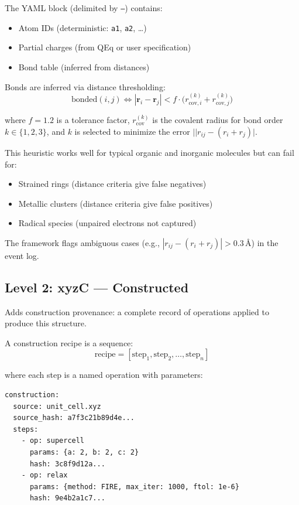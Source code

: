 \documentclass[11pt]{article}
\begin{document}
The YAML block (delimited by \texttt{---}) contains:
\begin{itemize}
\item Atom IDs (deterministic: \texttt{a1}, \texttt{a2}, \ldots)
\item Partial charges (from QEq or user specification)
\item Bond table (inferred from distances)
\end{itemize}

Bonds are inferred via distance thresholding:
\begin{equation}
\text{bonded}(i,j) \iff |\mathbf{r}_i - \mathbf{r}_j| < f \cdot \bigl(r_{\text{cov},i}^{(k)} + r_{\text{cov},j}^{(k)}\bigr)
\end{equation}

where $f = 1.2$ is a tolerance factor, $r_{\text{cov}}^{(k)}$ is the covalent radius for bond order $k \in \{1,2,3\}$, and $k$ is selected to minimize the error $||r_{ij} - (r_i + r_j)|$.

This heuristic works well for typical organic and inorganic molecules but can fail for:
\begin{itemize}
\item Strained rings (distance criteria give false negatives)
\item Metallic clusters (distance criteria give false positives)
\item Radical species (unpaired electrons not captured)
\end{itemize}

The framework flags ambiguous cases (e.g., $|r_{ij} - (r_i + r_j)| > 0.3$\,\AA) in the event log.

\subsection{Level 2: xyzC — Constructed}

Adds construction provenance: a complete record of operations applied to produce this structure.

A construction recipe is a sequence:
\begin{equation}
\text{recipe} = [\text{step}_1, \text{step}_2, \ldots, \text{step}_n]
\end{equation}

where each step is a named operation with parameters:
\begin{lstlisting}
construction:
  source: unit_cell.xyz
  source_hash: a7f3c21b89d4e...
  steps:
    - op: supercell
      params: {a: 2, b: 2, c: 2}
      hash: 3c8f9d12a...
    - op: relax
      params: {method: FIRE, max_iter: 1000, ftol: 1e-6}
      hash: 9e4b2a1c7...
\end{lstlisting}
\end{document}
